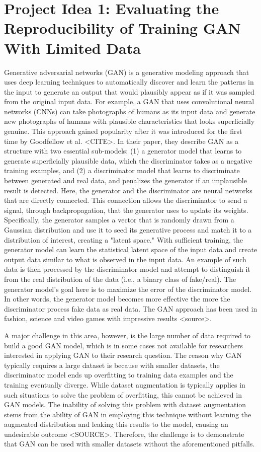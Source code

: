 \documentclass{report}
\begin{document}
\section{Project Idea 1: Evaluating the Reproducibility of Training GAN With Limited Data}

Generative adversarial networks (GAN) is a generative modeling approach that uses deep learning techniques to automatically discover and learn the patterns in the input to generate an output that would plausibly appear as if it was sampled from the original input data. For example, a GAN that uses convolutional neural networks (CNNs) can take photographs of humans as its input data and generate new photographs of humans with plausible characteristics that looks superficially genuine. This approach gained popularity after it was introduced for the first time by Goodfellow et al. <CITE>. In their paper, they describe GAN as a structure with two essential sub-models: (1) a generator model that learns to generate superficially plausible data, which the discriminator takes as a negative training examples, and (2) a discriminator model that learns to discriminate between generated and real data, and penalizes the generator if an implausible result is detected. Here, the generator and the discriminator are neural networks that are directly connected. This connection allows the discriminator to send a signal, through backpropagation, that the generator uses to update its weights. Specifically, the generator samples a vector that is randomly drawn from a Gaussian distribution and use it to seed its generative process and match it to a distribution of interest, creating a "latent space." With sufficient training, the generator model can learn the statistical latent space of the input data and create output data similar to what is observed in the input data. An example of such data is then processed by the discriminator model and attempt to distinguish it from the real distribution of the data (i.e., a binary class of fake/real). The generator model's goal here is to maximize the error of the discriminator model. In other words, the generator model becomes more effective the more the discriminator process fake data as real data. The GAN approach has been used in fashion, science and video games with impressive results <source>.

A major challenge in this area, however, is the large number of data required to build a good GAN model, which is in some cases not available for researchers interested in applying GAN to their research question. The reason why GAN typically requires a large dataset is because with smaller datasets, the discriminator model ends up overfitting to training data examples and the training eventually diverge. While dataset augmentation is typically applies in such situations to solve the problem of overfitting, this cannot be achieved in GAN models. The inability of solving this problem with dataset augmentation stems from the ability of GAN in employing this technique without learning the augmented distribution and leaking this results to the model, causing an undesirable outcome <SOURCE>. Therefore, the challenge is to demonstrate that GAN can be used with smaller datasets without the aforementioned pitfalls.
\end{document}
